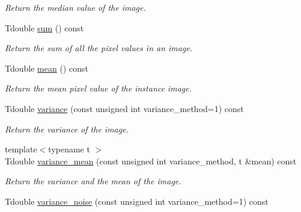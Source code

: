 \begin{DoxyCompactItemize}
\begin{DoxyCompactList}\small\item\em Return the median value of the image. \item\end{DoxyCompactList}\item 
\hypertarget{structcimg__library_1_1CImg_a68bce093adf59485652cdc5ed9468679}{
Tdouble \hyperlink{structcimg__library_1_1CImg_a68bce093adf59485652cdc5ed9468679}{sum} () const }
\label{structcimg__library_1_1CImg_a68bce093adf59485652cdc5ed9468679}

\begin{DoxyCompactList}\small\item\em Return the sum of all the pixel values in an image. \item\end{DoxyCompactList}\item 
\hypertarget{structcimg__library_1_1CImg_ab55b2b844cd115acb19f99e62b524c50}{
Tdouble \hyperlink{structcimg__library_1_1CImg_ab55b2b844cd115acb19f99e62b524c50}{mean} () const }
\label{structcimg__library_1_1CImg_ab55b2b844cd115acb19f99e62b524c50}

\begin{DoxyCompactList}\small\item\em Return the mean pixel value of the instance image. \item\end{DoxyCompactList}\item 
Tdouble \hyperlink{structcimg__library_1_1CImg_a392f71cadb214ede4a723315f44f371c}{variance} (const unsigned int variance\_\-method=1) const 
\begin{DoxyCompactList}\small\item\em Return the variance of the image. \item\end{DoxyCompactList}\item 
\hypertarget{structcimg__library_1_1CImg_a2afe78141285231d777607e26cf1b153}{
{\footnotesize template$<$typename t $>$ }\\Tdouble \hyperlink{structcimg__library_1_1CImg_a2afe78141285231d777607e26cf1b153}{variance\_\-mean} (const unsigned int variance\_\-method, t \&mean) const }
\label{structcimg__library_1_1CImg_a2afe78141285231d777607e26cf1b153}

\begin{DoxyCompactList}\small\item\em Return the variance and the mean of the image. \item\end{DoxyCompactList}\item 
\hypertarget{structcimg__library_1_1CImg_ab76ad9b33bab71b9dd79812a7f0c8e0c}{
Tdouble \hyperlink{structcimg__library_1_1CImg_ab76ad9b33bab71b9dd79812a7f0c8e0c}{variance\_\-noise} (const unsigned int variance\_\-method=1) const }
\label{structcimg__library_1_1CImg_ab76ad9b33bab71b9dd79812a7f0c8e0c}


\end{DoxyCompactItemize}
